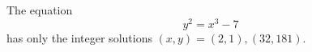 \begin{proposition}
    The equation
\[
    y^2=x^3-7
\]
    has only the integer solutions $(x,y)=(2,1),(32,181)$.
\end{proposition}
